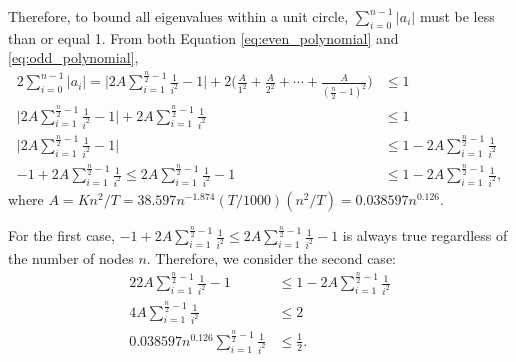 Therefore, to bound all eigenvalues within a unit circle, $\sum_{i=0}^{n-1}|a_i|$ must be less than or equal 1.
From both Equation \ref{eq:even_polynomial} and \ref{eq:odd_polynomial}, 
\begin{alignat}{2}
\sum_{i=0}^{n-1}|a_i| = \Bigg|2A\sum_{i=1}^{\frac{n}{2}-1}\frac{1}{i^2} - 1\Bigg| + 2\Bigg(\frac{A}{1^2} + \frac{A}{2^2} + \cdots + \frac{A}{(\frac{n}{2}-1)^2}\Bigg) & \leq 1 \nonumber \\
\Bigg|2A\sum_{i=1}^{\frac{n}{2}-1}\frac{1}{i^2} - 1\Bigg| + 2A\sum_{i=1}^{\frac{n}{2}-1}\frac{1}{i^2} & \leq 1 \nonumber \\
\Bigg|2A\sum_{i=1}^{\frac{n}{2}-1}\frac{1}{i^2} - 1\Bigg| & \leq 1 - 2A\sum_{i=1}^{\frac{n}{2}-1}\frac{1}{i^2} \nonumber \\
- 1 + 2A\sum_{i=1}^{\frac{n}{2}-1}\frac{1}{i^2} \leq 2A\sum_{i=1}^{\frac{n}{2}-1}\frac{1}{i^2} - 1 & \leq 1 - 2A\sum_{i=1}^{\frac{n}{2}-1}\frac{1}{i^2},
\end{alignat}
where $A = Kn^2/T = 38.597n^{-1.874}(T/1000)(n^2/T)= 0.038597n^{0.126}$.

For the first case, $- 1 + 2A\sum_{i=1}^{\frac{n}{2}-1}\frac{1}{i^2} \leq 2A\sum_{i=1}^{\frac{n}{2}-1}\frac{1}{i^2} - 1$ is always true regardless of the number of nodes $n$. Therefore, we consider the second case:
\begin{alignat}{2}
2A\sum_{i=1}^{\frac{n}{2}-1}\frac{1}{i^2} - 1 & \leq 1 - 2A\sum_{i=1}^{\frac{n}{2}-1}\frac{1}{i^2} \nonumber \\
4A\sum_{i=1}^{\frac{n}{2}-1}\frac{1}{i^2}  & \leq 2 \nonumber \\
0.038597n^{0.126}\sum_{i=1}^{\frac{n}{2}-1}\frac{1}{i^2}  & \leq \frac{1}{2}. 
\label{eq:maceybound}
\end{alignat}

